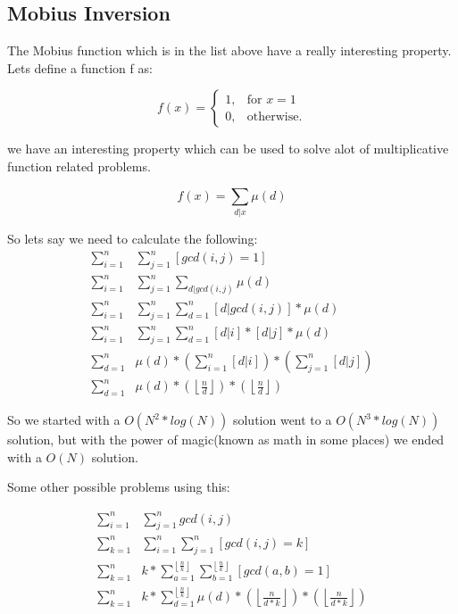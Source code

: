             
            \subsection{Mobius Inversion}

            \tab The Mobius function which is in the list above have a really interesting property. Lets define a function f as:

            $$
                f(x) = 
            \begin{cases}
                1, & \text{for } x = 1 \\
                0, & \text{otherwise.} 
            \end{cases}
            $$
            
            we have an interesting property which can be used to solve alot of multiplicative function related problems.

            $$
                f(x)  = \sum_{d|x}\mu(d)
            $$

            So lets say we need to calculate the following:
            \begin{align*}
                \sum_{i=1}^{n}& \sum_{j=1}^{n} [gcd(i,j) = 1] \\
                \sum_{i=1}^{n}& \sum_{j=1}^{n} \sum_{d|gcd(i,j)}\mu(d) \\
                \sum_{i=1}^{n}& \sum_{j=1}^{n} \sum_{d = 1}^{n} [d|gcd(i,j)]*\mu(d) \\
                \sum_{i=1}^{n}& \sum_{j=1}^{n} \sum_{d = 1}^{n} [d|i]*[d|j]*\mu(d) \\
            \sum_{d = 1}^{n}& \mu(d) * (\sum_{i=1}^{n}[d|i]) * (\sum_{j=1}^{n}[d|j]) \\
            \sum_{d = 1}^{n}& \mu(d) * (\left\lfloor \frac{n}{d} \right\rfloor) * (\left\lfloor \frac{n}{d} \right\rfloor) 
            \end{align*}

            So we started with a $O(N^2 * log(N))$ solution went to a $O(N^3 * log(N))$ solution, 
            but with the power of magic(known as math in some places) we ended with a $O(N)$ solution.

            Some other possible problems using this:
            
            \begin{align*}
                \sum_{i=1}^{n}& \sum_{j=1}^{n} gcd(i,j) \\
                \sum_{k=1}^{n}& \sum_{i=1}^{n} \sum_{j=1}^{n} [gcd(i,j) = k] \\
                \sum_{k=1}^{n}& k * \sum_{a=1}^{\left\lfloor \frac{n}{k} \right\rfloor} 
                \sum_{b=1}^{\left\lfloor \frac{n}{k} \right\rfloor} [gcd(a,b) = 1] \\
                \sum_{k=1}^{n}& k * \sum_{d = 1}^{\left\lfloor \frac{n}{k} \right\rfloor} \mu(d) * (\left\lfloor \frac{n}{d*k} \right\rfloor) * (\left\lfloor \frac{n}{d*k} \right\rfloor) 
            \end{align*}

